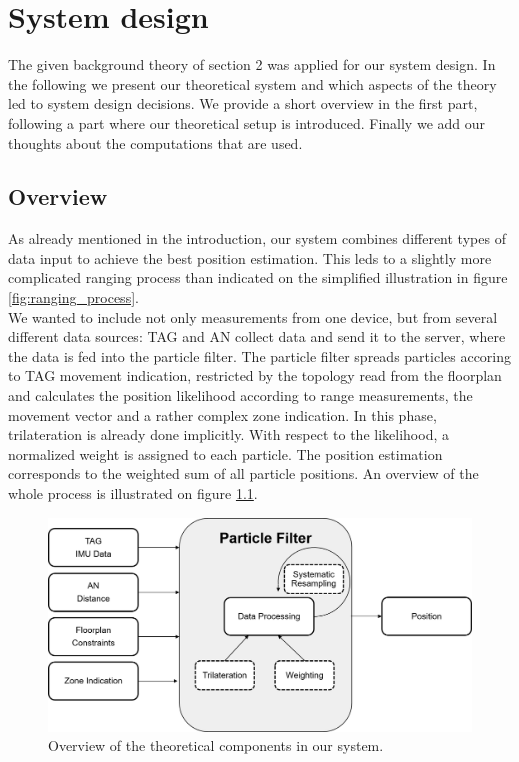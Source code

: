 
\chapter{System design} %

\label{Chapter3} %
The given background theory of section 2 was applied for our system design. In the following we present our theoretical system and which aspects of the theory led to system design decisions. We provide a short overview in the first part, following a part where our theoretical setup is introduced. Finally we add our thoughts about the computations that are used.


\section{Overview}
As already mentioned in the introduction, our system combines different types of data input to achieve the best position estimation. This leds to a slightly more complicated ranging process than indicated on the simplified illustration in figure \ref{fig:ranging_process}.\\
We wanted to include not only measurements from one device, but from several different data sources:
TAG and AN collect data and send it to the server, where the data is fed into the particle filter. The particle filter spreads particles accoring to TAG movement indication, restricted by the topology read from the floorplan and calculates the position likelihood according to range measurements, the movement vector and a rather complex zone indication. In this phase, trilateration is already done implicitly. With respect to the likelihood, a normalized weight is assigned to each particle. The position estimation corresponds to the weighted sum of all particle positions.
An overview of the whole process is illustrated on figure \ref{fig:particle_filter_design}.

\begin{figure}[th]
\centering
\includegraphics[width=1.0\textwidth]{Figures/particle_filter_design}
\decoRule
\caption[Particle Filter Design]{Overview of the theoretical components in our system.}
\label{fig:particle_filter_design}
\end{figure}


